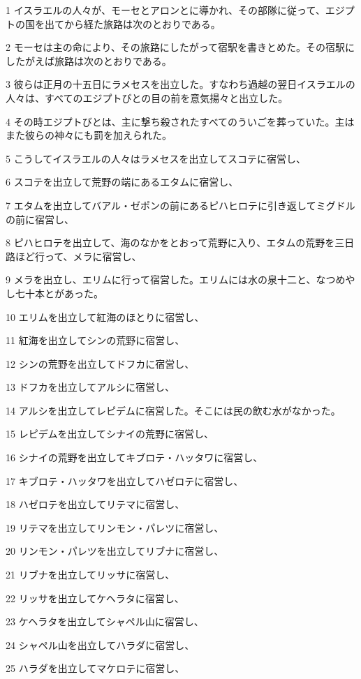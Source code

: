 \par 1 イスラエルの人々が、モーセとアロンとに導かれ、その部隊に従って、エジプトの国を出てから経た旅路は次のとおりである。
\par 2 モーセは主の命により、その旅路にしたがって宿駅を書きとめた。その宿駅にしたがえば旅路は次のとおりである。
\par 3 彼らは正月の十五日にラメセスを出立した。すなわち過越の翌日イスラエルの人々は、すべてのエジプトびとの目の前を意気揚々と出立した。
\par 4 その時エジプトびとは、主に撃ち殺されたすべてのういごを葬っていた。主はまた彼らの神々にも罰を加えられた。
\par 5 こうしてイスラエルの人々はラメセスを出立してスコテに宿営し、
\par 6 スコテを出立して荒野の端にあるエタムに宿営し、
\par 7 エタムを出立してバアル・ゼポンの前にあるピハヒロテに引き返してミグドルの前に宿営し、
\par 8 ピハヒロテを出立して、海のなかをとおって荒野に入り、エタムの荒野を三日路ほど行って、メラに宿営し、
\par 9 メラを出立し、エリムに行って宿営した。エリムには水の泉十二と、なつめやし七十本とがあった。
\par 10 エリムを出立して紅海のほとりに宿営し、
\par 11 紅海を出立してシンの荒野に宿営し、
\par 12 シンの荒野を出立してドフカに宿営し、
\par 13 ドフカを出立してアルシに宿営し、
\par 14 アルシを出立してレピデムに宿営した。そこには民の飲む水がなかった。
\par 15 レピデムを出立してシナイの荒野に宿営し、
\par 16 シナイの荒野を出立してキブロテ・ハッタワに宿営し、
\par 17 キブロテ・ハッタワを出立してハゼロテに宿営し、
\par 18 ハゼロテを出立してリテマに宿営し、
\par 19 リテマを出立してリンモン・パレツに宿営し、
\par 20 リンモン・パレツを出立してリブナに宿営し、
\par 21 リブナを出立してリッサに宿営し、
\par 22 リッサを出立してケヘラタに宿営し、
\par 23 ケヘラタを出立してシャペル山に宿営し、
\par 24 シャペル山を出立してハラダに宿営し、
\par 25 ハラダを出立してマケロテに宿営し、
